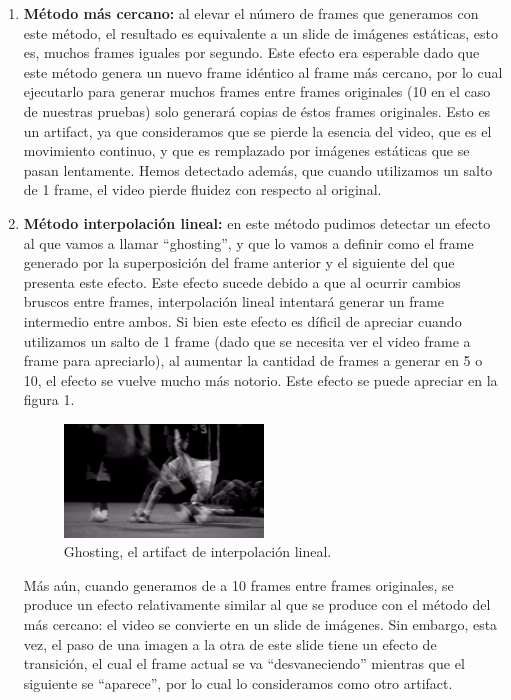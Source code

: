 \begin{enumerate}
\item \textbf{M\'etodo m\'as cercano:} al elevar el n\'umero de frames que generamos con este m\'etodo, el resultado es equivalente a un slide de im\'agenes est\'aticas, esto es, muchos frames iguales por segundo. Este efecto era esperable dado que este m\'etodo genera un nuevo frame id\'entico al frame m\'as cercano, por lo cual ejecutarlo para generar muchos frames entre frames originales (10 en el caso de nuestras pruebas) solo generar\'a copias de \'estos frames originales. Esto es un artifact, ya que consideramos que se pierde la esencia del video, que es el movimiento continuo, y que es remplazado por im\'agenes est\'aticas que se pasan lentamente. Hemos detectado adem\'as, que cuando utilizamos un salto de 1 frame, el video pierde fluidez con respecto al original.
\item \textbf{M\'etodo interpolaci\'on lineal:} en este m\'etodo pudimos detectar un efecto al que vamos a llamar ``ghosting'', y que lo vamos a definir como el frame generado por la superposici\'on del frame anterior y el siguiente del que presenta este efecto. Este efecto sucede debido a que al ocurrir cambios bruscos entre frames, interpolaci\'on lineal intentar\'a generar un frame intermedio entre ambos. Si bien este efecto es d\'ificil de apreciar cuando utilizamos un salto de 1 frame (dado que se necesita ver el video frame a frame para apreciarlo), al aumentar la cantidad de frames a generar en 5 o 10, el efecto se vuelve mucho m\'as notorio. Este efecto se puede apreciar en la figura 1.

\begin{figure}[H]
  \centering
    \includegraphics[width=0.5\textwidth]{img/artifact_lineal.png}
  	\caption{Ghosting, el artifact de interpolaci\'on lineal.}
\end{figure}

M\'as a\'un, cuando generamos de a 10 frames entre frames originales, se produce un efecto relativamente similar al que se produce con el m\'etodo del m\'as cercano: el video se convierte en un slide de im\'agenes. Sin embargo, esta vez, el paso de una imagen a la otra de este slide tiene un efecto de transici\'on, el cual el frame actual se va ``desvaneciendo'' mientras que el siguiente se ``aparece'', por lo cual lo consideramos como otro artifact.


\end{enumerate}
